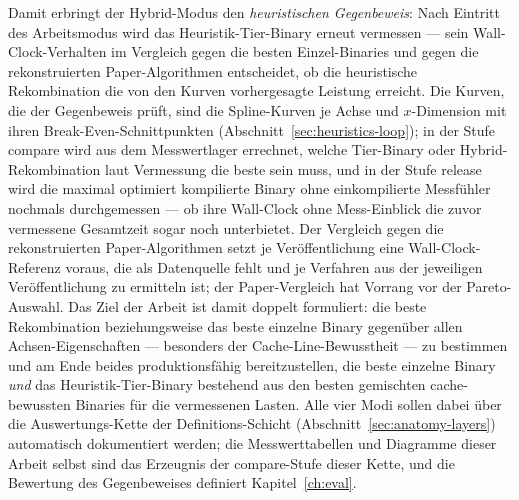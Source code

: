 \begin{nurlang}
Damit erbringt der Hybrid-Modus den \emph{heuristischen Gegenbeweis}: Nach Eintritt des Arbeitsmodus wird
das Heuristik-Tier-Binary erneut vermessen --- sein Wall-Clock-Verhalten im Vergleich gegen die besten
Einzel-Binaries und gegen die rekonstruierten Paper-Algorithmen entscheidet, ob die heuristische
Rekombination die von den Kurven vorhergesagte Leistung erreicht. Die Kurven, die der Gegenbeweis prüft, sind die
Spline-Kurven je Achse und $x$-Dimension mit ihren Break-Even-Schnittpunkten
(Abschnitt~\ref{sec:heuristics-loop}); in der Stufe compare wird aus dem Messwertlager errechnet, welche
Tier-Binary oder Hybrid-Rekombination laut Vermessung die beste sein muss, und in der Stufe release
wird die maximal optimiert kompilierte Binary ohne einkompilierte Messfühler nochmals durchgemessen ---
ob ihre Wall-Clock ohne Mess-Einblick die zuvor vermessene Gesamtzeit sogar noch unterbietet. Der
Vergleich gegen die rekonstruierten Paper-Algorithmen setzt je Veröffentlichung eine Wall-Clock-Referenz voraus,
die als Datenquelle fehlt und je Verfahren aus der jeweiligen Veröffentlichung zu ermitteln ist; der Paper-Vergleich
hat Vorrang vor der Pareto-Auswahl. Das Ziel der Arbeit ist damit doppelt formuliert: die
beste Rekombination beziehungsweise das beste einzelne Binary gegenüber allen Achsen-Eigenschaften ---
besonders der Cache-Line-Bewusstheit --- zu bestimmen und am Ende beides produktionsfähig
bereitzustellen, die beste einzelne Binary \emph{und} das Heuristik-Tier-Binary bestehend aus den besten gemischten cache-bewussten Binaries für die vermessenen Lasten. Alle vier Modi sollen
dabei über die Auswertungs-Kette der Definitions-Schicht (Abschnitt~\ref{sec:anatomy-layers})
automatisch dokumentiert werden; die Messwerttabellen und Diagramme dieser Arbeit selbst sind das Erzeugnis
der compare-Stufe dieser Kette, und die Bewertung des Gegenbeweises definiert Kapitel~\ref{ch:eval}.

\end{nurlang}
